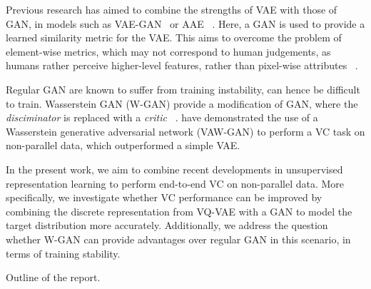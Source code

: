 \documentclass{article}
\begin{document}
Previous research has aimed to combine the strengths of VAE with those of GAN, in models such as VAE-GAN~\cite{Larsen2015} or AAE ~\cite{Makhzani2015}. Here, a GAN is used to provide a learned similarity metric for the VAE. This aims to overcome the problem of element-wise metrics, which may not correspond to human judgements, as humans rather perceive higher-level features, rather than pixel-wise attributes ~\citep{Larsen2015}. 

Regular GAN are known to suffer from training instability, can hence be difficult to train. Wasserstein GAN (W-GAN) provide a modification of GAN, where the \textit{disciminator} is replaced with a \textit{critic} ~\citep{Arjovsky2017}. \cite{Hsu2017} have demonstrated the use of a Wasserstein generative adversarial network (VAW-GAN) to perform a VC task on non-parallel data, which outperformed a simple VAE. 

In the present work, we aim to combine recent developments in unsupervised representation learning to perform end-to-end VC on non-parallel data. More specifically, we investigate whether VC performance can be improved by combining the discrete representation from VQ-VAE with a GAN to model the target distribution more accurately. Additionally, we address the question whether W-GAN can provide advantages over regular GAN in this scenario, in terms of training stability. 


Outline of the report.




\end{document}
